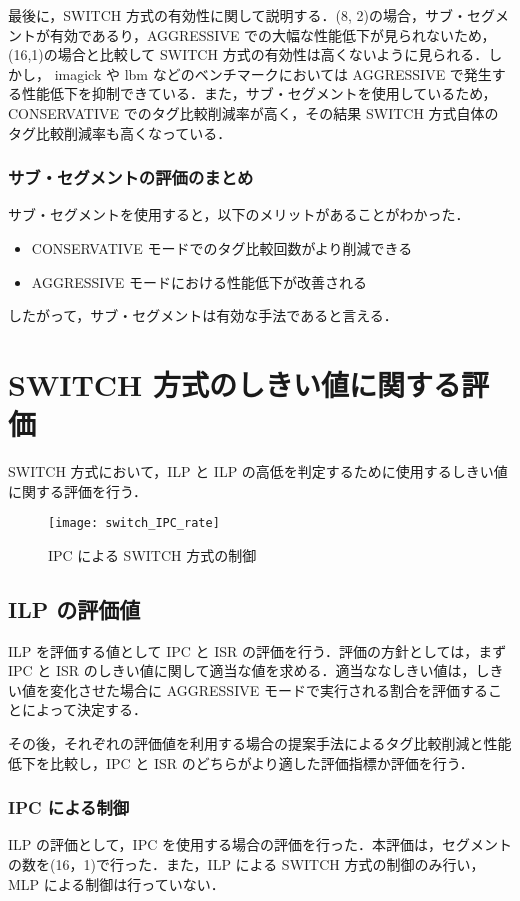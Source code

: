 最後に，SWITCH 方式の有効性に関して説明する．(8, 2)の場合，サブ・セグメントが有効であるり，AGGRESSIVE での大幅な性能低下が見られないため，(16,1)の場合と比較して SWITCH 方式の有効性は高くないように見られる．しかし， imagick や lbm などのベンチマークにおいては AGGRESSIVE で発生する性能低下を抑制できている．また，サブ・セグメントを使用しているため，CONSERVATIVE でのタグ比較削減率が高く，その結果 SWITCH 方式自体のタグ比較削減率も高くなっている．

\subsubsection{サブ・セグメントの評価のまとめ}
サブ・セグメントを使用すると，以下のメリットがあることがわかった．
\begin{itemize}
  \item CONSERVATIVE モードでのタグ比較回数がより削減できる
  \item AGGRESSIVE モードにおける性能低下が改善される
\end{itemize}
したがって，サブ・セグメントは有効な手法であると言える．

\section{SWITCH 方式のしきい値に関する評価}
\label{sec:eval_threshold}
SWITCH 方式において，ILP と ILP の高低を判定するために使用するしきい値に関する評価を行う．

\begin{figure}[htb]
  \centering
  \texttt{[image: switch\_IPC\_rate]}
  \caption{IPC による SWITCH 方式の制御}
  \label{fig:switch_IPC_rate}
\end{figure}

\subsection{ILP の評価値}
ILP を評価する値として IPC と ISR の評価を行う．評価の方針としては，まず IPC と ISR のしきい値に関して適当な値を求める．適当ななしきい値は，しきい値を変化させた場合に AGGRESSIVE モードで実行される割合を評価することによって決定する．

その後，それぞれの評価値を利用する場合の提案手法によるタグ比較削減と性能低下を比較し，IPC と ISR のどちらがより適した評価指標か評価を行う．

\subsubsection{IPC による制御}
ILP の評価として，IPC を使用する場合の評価を行った．本評価は，セグメントの数を(16，1)で行った．また，ILP による SWITCH 方式の制御のみ行い，MLP による制御は行っていない．


